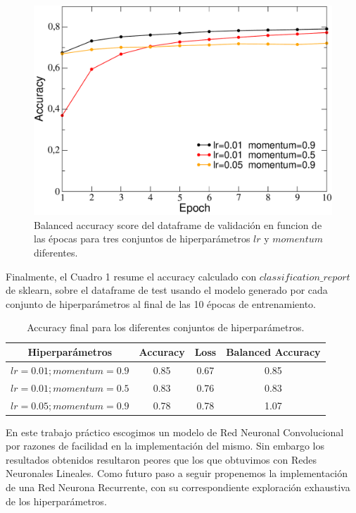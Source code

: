 \documentclass[a4paper,10pt]{article}
\begin{document}
\begin{figure}[h]
\centering
\includegraphics[scale=0.35]{data/accuracy-conv.pdf}
\caption{Balanced accuracy score del dataframe de validación en funcion de las épocas para tres conjuntos de hiperparámetros $lr$ y $momentum$ diferentes.}
\label{fig02}
\end{figure}


Finalmente, el Cuadro 1 resume el accuracy calculado con $classification\_report$ de sklearn, sobre el dataframe de test usando el modelo generado por cada conjunto de hiperparámetros al final de las 10 épocas de entrenamiento.
\begin{table}[h]
\caption{Accuracy final para los diferentes conjuntos de hiperparámetros.}\label{tab:data}
\begin{tabular}{cccc}
\hline
Hiperparámetros  & Accuracy & Loss & Balanced Accuracy\\
\hline
\hline
$lr=0.01; momentum=0.9$ &  0.85 & 0.67 & 0.85\\
$lr=0.01; momentum=0.5$ &  0.83 & 0.76 & 0.83\\
$lr=0.05; momentum=0.9$ &  0.78 & 0.78 & 1.07
\end{tabular}
\end{table}

En este trabajo práctico escogimos un modelo de Red Neuronal Convolucional por razones de facilidad en la implementación del mismo. Sin embargo los resultados obtenidos resultaron peores que los que obtuvimos con Redes Neuronales Lineales. Como futuro paso a seguir propenemos la implementación de una Red Neurona Recurrente, con su correspondiente exploración exhaustiva de los hiperparámetros.
\end{document}
